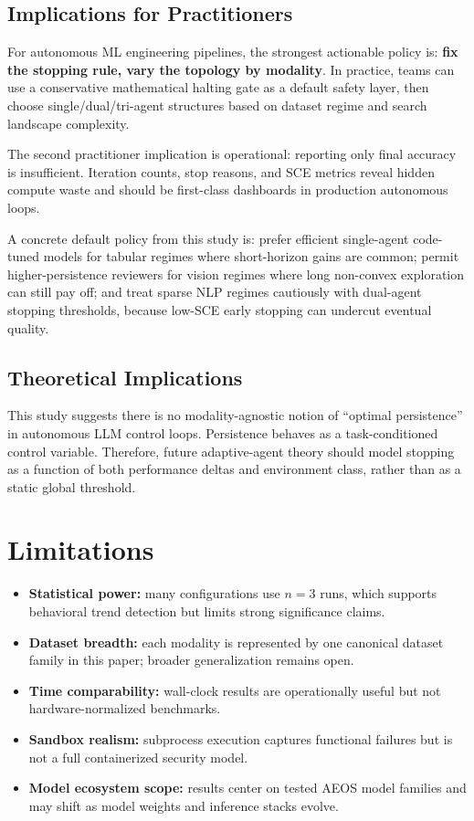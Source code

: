 \documentclass[11pt,a4paper]{article}
\begin{document}
\subsection{Implications for Practitioners}

For autonomous ML engineering pipelines, the strongest actionable policy is: \textbf{fix the stopping rule, vary the topology by modality}. In practice, teams can use a conservative mathematical halting gate as a default safety layer, then choose single/dual/tri-agent structures based on dataset regime and search landscape complexity.

The second practitioner implication is operational: reporting only final accuracy is insufficient. Iteration counts, stop reasons, and SCE metrics reveal hidden compute waste and should be first-class dashboards in production autonomous loops.

A concrete default policy from this study is: prefer efficient single-agent code-tuned models for tabular regimes where short-horizon gains are common; permit higher-persistence reviewers for vision regimes where long non-convex exploration can still pay off; and treat sparse NLP regimes cautiously with dual-agent stopping thresholds, because low-SCE early stopping can undercut eventual quality.

\subsection{Theoretical Implications}

This study suggests there is no modality-agnostic notion of ``optimal persistence'' in autonomous LLM control loops. Persistence behaves as a task-conditioned control variable. Therefore, future adaptive-agent theory should model stopping as a function of both performance deltas and environment class, rather than as a static global threshold.

\section{Limitations}

\begin{itemize}
    \item \textbf{Statistical power:} many configurations use $n=3$ runs, which supports behavioral trend detection but limits strong significance claims.
    \item \textbf{Dataset breadth:} each modality is represented by one canonical dataset family in this paper; broader generalization remains open.
    \item \textbf{Time comparability:} wall-clock results are operationally useful but not hardware-normalized benchmarks.
    \item \textbf{Sandbox realism:} subprocess execution captures functional failures but is not a full containerized security model.
    \item \textbf{Model ecosystem scope:} results center on tested AEOS model families and may shift as model weights and inference stacks evolve.
\end{itemize}
\end{document}

